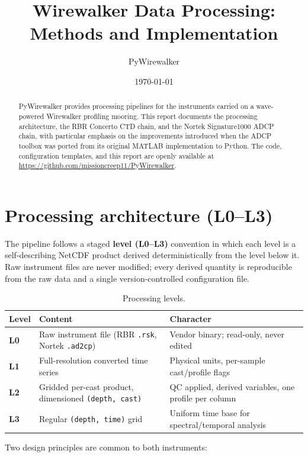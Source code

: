 \documentclass[11pt]{article}
\title{\textbf{Wirewalker Data Processing: Methods and Implementation}}
\author{PyWirewalker}
\date{\today}
\newcommand{\code}[1]{\texttt{#1}}
\begin{document}
\maketitle

\begin{abstract}
\noindent
PyWirewalker provides processing pipelines for the instruments carried on a wave-powered
Wirewalker profiling mooring. This report documents the processing architecture, the RBR
Concerto CTD chain, and the Nortek Signature1000 ADCP chain, with particular emphasis on the
improvements introduced when the ADCP toolbox was ported from its original MATLAB
implementation to Python. The code, configuration templates, and this report are openly
available at \url{https://github.com/missioncreep11/PyWirewalker}.
\end{abstract}

\section{Processing architecture (L0--L3)}

The pipeline follows a staged \textbf{level (L0--L3)} convention in which each level is a
self-describing NetCDF product derived deterministically from the level below it. Raw
instrument files are never modified; every derived quantity is reproducible from the raw
data and a single version-controlled configuration file.

\begin{table}[h]
\centering
\begin{tabular}{@{}p{} p{} p{}@{}}
\toprule
\textbf{Level} & \textbf{Content} & \textbf{Character} \\
\midrule
\textbf{L0} & Raw instrument file (RBR \code{.rsk}, Nortek \code{.ad2cp}) & Vendor binary; read-only, never edited \\
\textbf{L1} & Full-resolution converted time series & Physical units, per-sample cast/profile flags \\
\textbf{L2} & Gridded per-cast product, dimensioned \code{(depth, cast)} & QC applied, derived variables, one profile per column \\
\textbf{L3} & Regular \code{(depth, time)} grid & Uniform time base for spectral/temporal analysis \\
\bottomrule
\end{tabular}
\caption{Processing levels.}
\end{table}

Two design principles are common to both instruments:
\end{document}

